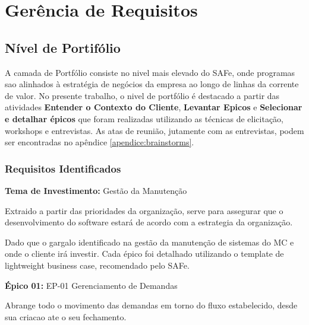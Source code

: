 \chapter[Gerência de Requisitos]{Gerência de Requisitos}

\section{Nível de Portifólio}

A camada de Portfólio consiste no nivel mais elevado do SAFe, onde programas sao alinhados à
estratégia de negócios da empresa ao longo de linhas da corrente de valor. No presente trabalho,
o nivel de portfólio é destacado a partir das atividades \textbf{Entender o Contexto do Cliente},
\textbf{Levantar Epicos} e \textbf{Selecionar e detalhar épicos} que foram realizadas utilizando as
técnicas de elicitação, workshops e entrevistas. As atas de reunião, jutamente com as entrevistas,
podem ser encontradas no apêndice \ref{apendice:brainstorms}.

\subsection{Requisitos Identificados}

\textbf{Tema de Investimento:} Gestão da Manutenção

Extraido a partir das prioridades da organização, serve para assegurar que o desenvolvimento
do software estará de acordo com a estrategia da organização.

Dado que o gargalo identificado na gestão da manutenção de sistemas do MC e onde o cliente irá investir.
Cada épico foi detalhado utilizando o template de lightweight business case, recomendado pelo SAFe. \cite{scaleP}

\textbf{Épico 01:} EP-01 Gerenciamento de Demandas

Abrange todo o movimento das demandas em torno do fluxo estabelecido, desde sua criacao ate o seu fechamento.


